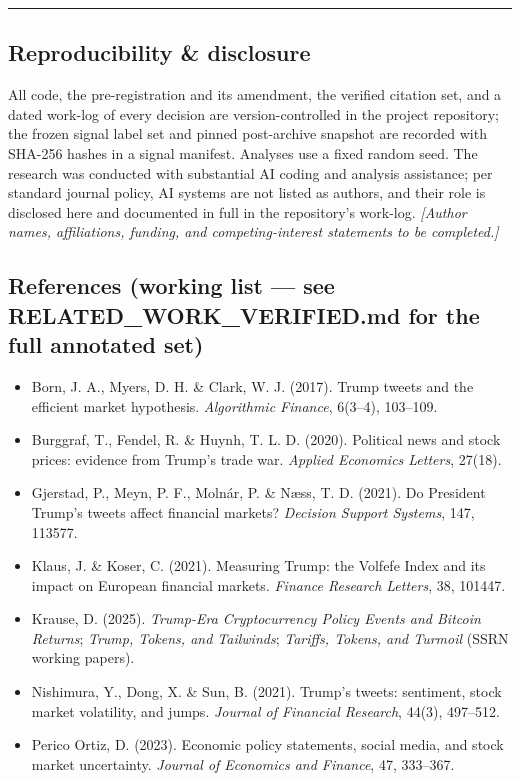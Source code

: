 \documentclass[
]{article}
\providecommand{\tightlist}{%
  \setlength{\itemsep}{0pt}\setlength{\parskip}{0pt}}
\begin{document}
\begin{center}\rule{0.5\linewidth}{0.5pt}\end{center}

\subsection{Reproducibility \&
disclosure}\label{reproducibility-disclosure}

All code, the pre-registration and its amendment, the verified citation
set, and a dated work-log of every decision are version-controlled in
the project repository; the frozen signal label set and pinned
post-archive snapshot are recorded with SHA-256 hashes in a signal
manifest. Analyses use a fixed random seed. The research was conducted
with substantial AI coding and analysis assistance; per standard journal
policy, AI systems are not listed as authors, and their role is
disclosed here and documented in full in the repository's work-log.
\emph{{[}Author names, affiliations, funding, and competing-interest
statements to be completed.{]}}

\subsection{References (working list --- see RELATED\_WORK\_VERIFIED.md
for the full annotated
set)}\label{references-working-list-see-related_work_verified.md-for-the-full-annotated-set}

\begin{itemize}
\tightlist
\item
  Born, J. A., Myers, D. H. \& Clark, W. J. (2017). Trump tweets and the
  efficient market hypothesis. \emph{Algorithmic Finance}, 6(3--4),
  103--109.
\item
  Burggraf, T., Fendel, R. \& Huynh, T. L. D. (2020). Political news and
  stock prices: evidence from Trump's trade war. \emph{Applied Economics
  Letters}, 27(18).
\item
  Gjerstad, P., Meyn, P. F., Molnár, P. \& Næss, T. D. (2021). Do
  President Trump's tweets affect financial markets? \emph{Decision
  Support Systems}, 147, 113577.
\item
  Klaus, J. \& Koser, C. (2021). Measuring Trump: the Volfefe Index and
  its impact on European financial markets. \emph{Finance Research
  Letters}, 38, 101447.
\item
  Krause, D. (2025). \emph{Trump-Era Cryptocurrency Policy Events and
  Bitcoin Returns}; \emph{Trump, Tokens, and Tailwinds}; \emph{Tariffs,
  Tokens, and Turmoil} (SSRN working papers).
\item
  Nishimura, Y., Dong, X. \& Sun, B. (2021). Trump's tweets: sentiment,
  stock market volatility, and jumps. \emph{Journal of Financial
  Research}, 44(3), 497--512.
\item
  Perico Ortiz, D. (2023). Economic policy statements, social media, and
  stock market uncertainty. \emph{Journal of Economics and Finance}, 47,
  333--367.
\end{itemize}
\end{document}

